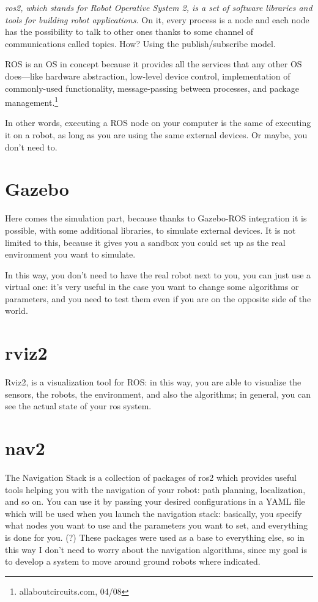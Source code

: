 {\it \acrshort{ros}2, which stands for Robot Operative System 2, is a set of software libraries and tools for building robot applications.}\cite{ros2desc} On it, every process is a node and each node has the possibility to talk to other ones thanks to some channel of communications called topics. How? Using the publish/subscribe model.

ROS is an OS in concept because it provides all the services that any other OS does—like hardware abstraction, low-level device control, implementation of commonly-used functionality, message-passing between processes, and package management.\footnote{allaboutcircuits.com, 04/08}

In other words, executing a ROS node on your computer is the same of executing it on a robot, as long as you are using the same external devices. Or maybe, you don't need to.

\section{Gazebo}

Here comes the simulation part, because thanks to Gazebo-ROS integration it is possible, with some additional libraries, to simulate external devices. It is not limited to this, because it gives you a sandbox you could set up as the real environment you want to simulate.

In this way, you don't need to have the real robot next to you, you can just use a virtual one: it's very useful in the case you want to change some algorithms or parameters, and you need to test them even if you are on the opposite side of the world.


\section{rviz2}

Rviz2, is a visualization tool for ROS: in this way, you are able to visualize the sensors, the robots, the environment, and also the algorithms; in general, you can see the actual state of your \acrshort{ros} system.

\section{\acrfull{nav2}}

The Navigation Stack is a collection of packages of \acrshort{ros}2 which provides useful tools helping you with the navigation of your robot: path planning, localization, and so on. You can use it by passing your desired configurations in a YAML file which will be used when you launch the navigation stack: basically, you specify what nodes you want to use and the parameters you want to set, and everything is done for you. (?)
These packages were used as a base to everything else, so in this way I don't need to worry about the navigation algorithms, since my goal is to develop a system to move around ground robots where indicated.

